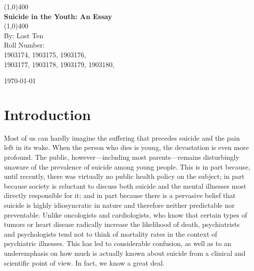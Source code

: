\documentclass[11pt]{article}
\begin{document}
\begin{titlepage}
    \begin{center}
        \vspace*{1cm}
        \vfill
        \line(1,0){400}\\[1mm]
        \huge{\textbf{Suicide in the Youth: An Essay}}\\[3mm]
        \line(1,0){400}\\
        \vfill
        By: Last Ten \\        
        Roll Number: \\
        1903174,
        1903175,
        1903176,
        \\1903177,
        1903178,
        1903179,
        1903180,

        \today\\
    \end{center}
\end{titlepage}

\tableofcontents
\thispagestyle{empty}
\clearpage

\setcounter{page}{1}

\section{Introduction}
Most of us can hardly imagine the suffering that precedes suicide and the pain left in its wake. When the person who dies is young, the devastation is even more profound. The public, however—including most parents—remains disturbingly unaware of the prevalence of suicide among young people. This is in part because, until recently, there was virtually no public health policy on the subject; in part because society is reluctant to discuss both suicide and the mental illnesses most directly responsible for it; and in part because there is a pervasive belief that suicide is highly idiosyncratic in nature and therefore neither predictable nor preventable. Unlike oncologists and cardiologists, who know that certain types of tumors or heart disease radically increase the likelihood of death, psychiatrists and psychologists tend not to think of mortality rates in the context of psychiatric illnesses. This has led to considerable confusion, as well as to an underemphasis on how much is actually known about suicide from a clinical and scientiﬁc point of view. In fact, we know a great deal.
\end{document}
